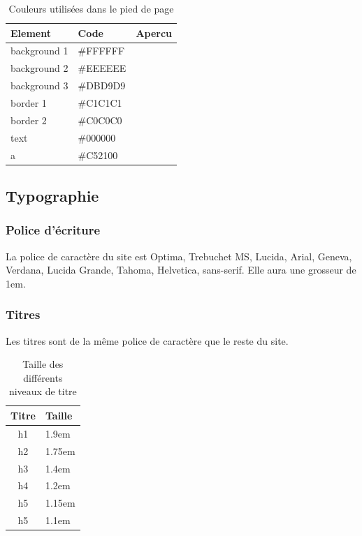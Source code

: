 \documentclass[letter, 11pt]{report}
\begin{document}
\begin{table}[htpb]
	\caption{Couleurs utilisées dans le pied de page}
	\begin{center}
		\begin{tabular}{|l|l|l|}
			\hline
			Element      & Code     & Apercu \\
			\hline
			background 1 & \#FFFFFF & \cellcolor[HTML]{FFFFFF} \\ \hline
			background 2 & \#EEEEEE & \cellcolor[HTML]{EEEEEE} \\ \hline
			background 3 & \#DBD9D9 & \cellcolor[HTML]{DBD9D9} \\ \hline
			border 1     & \#C1C1C1 & \cellcolor[HTML]{C1C1C1} \\ \hline
			border 2     & \#C0C0C0 & \cellcolor[HTML]{C0C0C0} \\ \hline
			text         & \#000000 & \cellcolor[HTML]{000000} \\ \hline
			a            & \#C52100 & \cellcolor[HTML]{C52100} \\ \hline
		\end{tabular}
	\end{center}
\end{table}

\subsection{Typographie}

\subsubsection{Police d’écriture}

La police de caractère du site est Optima, Trebuchet MS, Lucida, Arial, Geneva, Verdana, Lucida Grande, Tahoma, Helvetica, sans-serif. Elle aura une grosseur de 1em.

\subsubsection{Titres}
Les titres sont de la même police de caractère que le reste du site. 

\begin{table}[h!tbp]
	\caption{Taille des différents niveaux de titre}
	\begin{center}
		\begin{tabular}{|c|l|}
			\hline
			Titre & Taille \\
			\hline
			h1    & 1.9em\\
			h2    & 1.75em\\
			h3    & 1.4em\\
			h4    & 1.2em\\
			h5    & 1.15em\\
			h5    & 1.1em\\
			\hline
		\end{tabular}
	\end{center}
\end{table}
\end{document}
